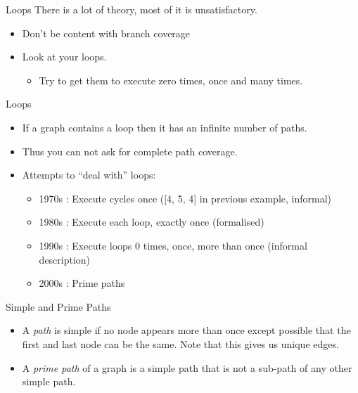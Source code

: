 \documentclass[handout]{beamer}
\begin{document}
\begin{frame}{Loops}
There is a lot of theory, most of it is unsatisfactory. 
  \begin{itemize}
  \item Don't be content with branch coverage
  \item Look at your loops.
    \begin{itemize}
    \item Try to get them to execute zero times, once and many times.
    \end{itemize}
  \end{itemize}
\end{frame}
  \begin{frame}{Loops}
    \begin{itemize}
      
  \item If a graph contains a loop then it has an infinite number of
    paths.
  \item Thus you can not ask for complete path coverage. 
  \item Attempts to “deal with” loops:
    \begin{itemize}
    \item 1970s : Execute cycles once  ([4, 5, 4] in previous example, informal)
    \item 1980s : Execute each loop, exactly once (formalised)
    \item 1990s : Execute loops 0 times, once, more than once (informal description)
    \item 2000s : Prime paths
\end{itemize}
  \end{itemize}
  
\end{frame}
\begin{frame}{Simple and Prime Paths}
  \begin{itemize}
  \item A {\it path} is simple if no node appears more than once except
    possible that the first and last node can be the same. Note that this
    gives us unique edges.
  \item A {\it prime path} of a graph is a simple path that is not a
    sub-path of any other simple path.
  \end{itemize}
  
\end{frame}
\end{document}
